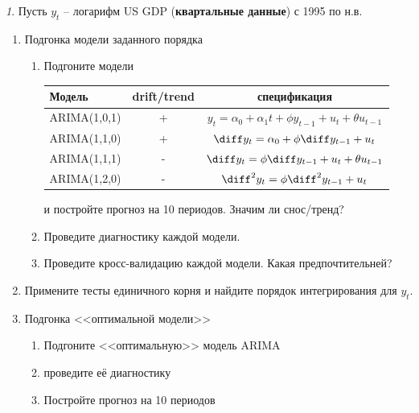 \documentclass[12pt]{article}
\theoremstyle{remark}
\newtheorem{exercise}{}[subsection]
\begin{document}
\begin{exercise}
Пусть \(y_t\) -- логарифм US GDP (\textbf{квартальные данные}) с 1995 по н.в.
\begin{enumerate}
	\item Подгонка модели заданного порядка
	\begin{enumerate}
		\item Подгоните модели
		\begin{center}\small
		\begin{tabular}{l|c|c}
			Модель & drift/trend  & спецификация\\ \hline
			ARIMA(1,0,1) & + & \(y_t=\alpha_0+\alpha_1t+\phi y_{t-1}+u_t+\theta u_{t-1}\)\\
			ARIMA(1,1,0) & + & \(\diff y_t=\alpha_0+\phi\diff y_{t-1}+u_t\)\\
			ARIMA(1,1,1) & - & \(\diff y_t=\phi\diff y_{t-1}+u_t+\theta u_{t-1}\) \\
			ARIMA(1,2,0) & - & \(\diff^2 y_t=\phi\diff^2 y_{t-1}+u_t\)\\ \hline
		\end{tabular}
		\end{center} 
		и постройте прогноз на 10 периодов. Значим ли снос/тренд?
		\item Проведите диагностику каждой модели.
		\item Проведите кросс-валидацию каждой модели. Какая предпочтительней?
	\end{enumerate}
	\item Примените тесты единичного корня и найдите порядок интегрирования для \(y_t\). 
	\item Подгонка <<оптимальной модели>>
	\begin{enumerate}
		\item Подгоните <<оптимальную>> модель ARIMA
		\item проведите её диагностику
		\item Постройте прогноз на 10 периодов
	\end{enumerate}
\end{enumerate}
\end{exercise}

\end{document}
